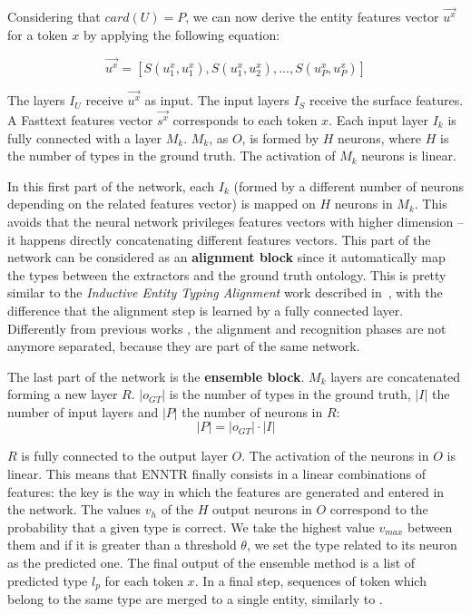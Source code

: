 \documentclass{llncs}
\begin{document}
Considering that $card(U)=P$, we can now derive the entity features vector $\vec{u^{x}}$ for a token $x$ by applying the following equation: 

$$ \vec{u^{x}} = [S(u^{x}_{1},u^{x}_{1}),S(u^{x}_{1},u^{x}_{2}),...,S(u^{x}_{P},u^{x}_{P})] $$

The layers $I_U$ receive $\vec{u^{x}}$ as input. The input layers $I_S$ receive the surface features. A Fasttext features vector $\vec{s^{x}}$ corresponds to each token $x$. Each input layer $I_k$ is fully connected with a layer $M_k$. $M_k$, as $O$, is formed by $H$ neurons, where $H$ is the number of types in the ground truth. The activation of $M_k$ neurons is linear.

In this first part of the network, each $I_k$ (formed by a different number of neurons depending on the related features vector) is mapped on $H$ neurons in $M_k$. This avoids that the neural network privileges features vectors with higher dimension -- it happens directly concatenating different features vectors. This part of the network can be considered as an \textbf{alignment block} since it automatically map the types between the extractors and the ground truth ontology. This is pretty similar to the \textit{Inductive Entity Typing Alignment} work described in~\cite{nerd4}, with the difference that the alignment step is learned by a fully connected layer. Differently from previous works \cite{fox1,fox2}, the alignment and recognition phases are not anymore separated, because they are part of the same network. 

The last part of the network is the \textbf{ensemble block}. $M_k$ layers are concatenated forming a new layer $R$. $\left\vert{o_{GT}}\right\vert$ is the number of types in the ground truth, $\left\vert{I}\right\vert$ the number of input layers and $\left\vert{P}\right\vert$ the number of neurons in $R$:
 $$\left\vert{P}\right\vert =  \left\vert{o_{GT}}\right\vert \cdot \left\vert{I}\right\vert$$
 
$R$ is fully connected to the output layer $O$. The activation of the neurons in $O$ is linear. This means that ENNTR finally consists in a linear combinations of features: the key is the way in which the features are generated and entered in the network. The values $v_h$ of the $H$ output neurons in $O$ correspond to the probability that a given type is correct. We take the highest value $v_{max}$ between them and if it is greater than a threshold $\theta$, we set the type related to its neuron as the predicted one. The final output of the ensemble method is a list of predicted type $l_{p}$ for each token $x$. In a final step, sequences of token which belong to the same type are merged to a single entity, similarly to \cite{fox1,fox2}.
\end{document}
